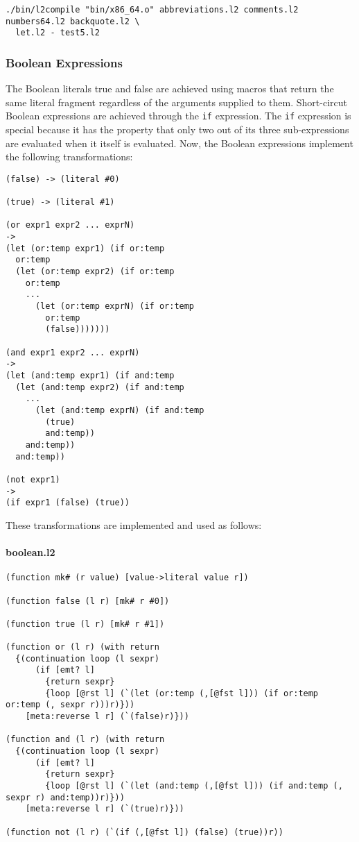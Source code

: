 \documentclass[]{article}
\let\oldparagraph\paragraph
\renewcommand{\paragraph}[1]{\oldparagraph{#1}\mbox{}}
\begin{document}
\begin{verbatim}
./bin/l2compile "bin/x86_64.o" abbreviations.l2 comments.l2 numbers64.l2 backquote.l2 \
  let.l2 - test5.l2
\end{verbatim}

\hypertarget{boolean-expressions}{\subsubsection{Boolean
Expressions}\label{boolean-expressions}}

The Boolean literals true and false are achieved using macros that
return the same literal fragment regardless of the arguments supplied to
them. Short-circut Boolean expressions are achieved through the
\texttt{if} expression. The \texttt{if} expression is special because it
has the property that only two out of its three sub-expressions are
evaluated when it itself is evaluated. Now, the Boolean expressions
implement the following transformations:

\begin{verbatim}
(false) -> (literal #0)

(true) -> (literal #1)

(or expr1 expr2 ... exprN)
->
(let (or:temp expr1) (if or:temp
  or:temp
  (let (or:temp expr2) (if or:temp
    or:temp
    ...
      (let (or:temp exprN) (if or:temp
        or:temp
        (false)))))))

(and expr1 expr2 ... exprN)
->
(let (and:temp expr1) (if and:temp
  (let (and:temp expr2) (if and:temp
    ...
      (let (and:temp exprN) (if and:temp
        (true)
        and:temp))
    and:temp))
  and:temp))

(not expr1)
->
(if expr1 (false) (true))
\end{verbatim}

These transformations are implemented and used as follows:

\paragraph{boolean.l2}\label{boolean.l2}

\begin{verbatim}
(function mk# (r value) [value->literal value r])

(function false (l r) [mk# r #0])

(function true (l r) [mk# r #1])

(function or (l r) (with return
  {(continuation loop (l sexpr)
      (if [emt? l]
        {return sexpr}
        {loop [@rst l] (`(let (or:temp (,[@fst l])) (if or:temp or:temp (, sexpr r)))r)}))
    [meta:reverse l r] (`(false)r)}))

(function and (l r) (with return
  {(continuation loop (l sexpr)
      (if [emt? l]
        {return sexpr}
        {loop [@rst l] (`(let (and:temp (,[@fst l])) (if and:temp (, sexpr r) and:temp))r)}))
    [meta:reverse l r] (`(true)r)}))

(function not (l r) (`(if (,[@fst l]) (false) (true))r))
\end{verbatim}
\end{document}
